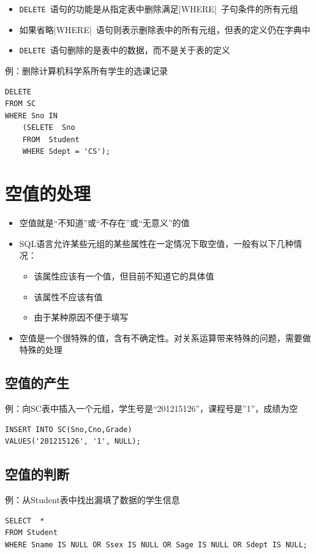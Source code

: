 \begin{itemize}
    \item \verb|DELETE|\ 语句的功能是从指定表中删除满足\sverb|WHERE|\ 子句条件的所有元组
    \item 如果省略\sverb|WHERE|\ 语句则表示删除表中的所有元组，但表的定义仍在字典中
    \item \verb|DELETE|\ 语句删除的是表中的数据，而不是关于表的定义
\end{itemize}

例：删除计算机科学系所有学生的选课记录
\begin{lstlisting}
DELETE
FROM SC
WHERE Sno IN
	(SELETE  Sno
	FROM  Student
	WHERE Sdept = 'CS');
\end{lstlisting}

\section{空值的处理}
\begin{itemize}
    \item 空值就是“不知道”或“不存在”或“无意义”的值
    \item SQL语言允许某些元组的某些属性在一定情况下取空值，一般有以下几种情况：
    \begin{itemize}
        \item 该属性应该有一个值，但目前不知道它的具体值
        \item 该属性不应该有值
        \item 由于某种原因不便于填写
    \end{itemize}
    \item 空值是一个很特殊的值，含有不确定性。对关系运算带来特殊的问题，需要做特殊的处理
\end{itemize}

\subsection{空值的产生}
例：向SC表中插入一个元组，学生号是“201215126”，课程号是”1”，成绩为空
\begin{lstlisting}
INSERT INTO SC(Sno,Cno,Grade)
VALUES('201215126', '1', NULL);   
\end{lstlisting}

\subsection{空值的判断}
例：从Student表中找出漏填了数据的学生信息
\begin{lstlisting}
SELECT  *
FROM Student
WHERE Sname IS NULL OR Ssex IS NULL OR Sage IS NULL OR Sdept IS NULL;
\end{lstlisting}

